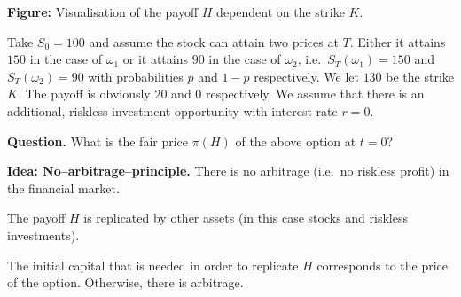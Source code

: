 \documentclass[12pt]{amsart}
\begin{document}
\begin{center}

    \vspace{0.5em}
    \small\textbf{Figure:} Visualisation of the payoff \(H\) dependent on the strike \(K\).
\end{center}

Take \(S_0=100\) and assume the stock can attain two prices at \(T\). Either it attains \(150\) in the case of \(\omega_1\) or it attains \(90\) in the case of \(\omega_2\), i.e.\ \(S_T(\omega_1) = 150\) and \(S_T(\omega_2) = 90\) with probabilities \(p\) and \(1-p\) respectively. We let \(130\) be the strike \(K\). The payoff is obviously \(20\) and \(0\) respectively. We assume that there is an additional, riskless investment opportunity with interest rate \(r=0\).

\textbf{Question.} What is the fair price \(\pi(H)\) of the above option at \(t=0\)?

\textbf{Idea: No--arbitrage--principle.}
There is no arbitrage (i.e.\ no riskless profit) in the financial market.

The payoff \(H\) is replicated by other assets (in this case stocks and riskless investments).

The initial capital that is needed in order to replicate \(H\) corresponds to the price of the option. Otherwise, there is arbitrage.
\end{document}
